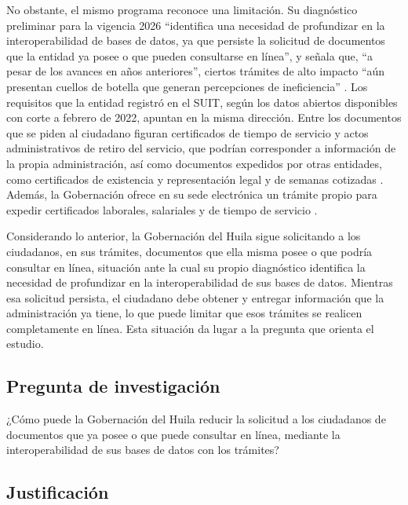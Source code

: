 No obstante, el mismo programa reconoce una limitación. Su diagnóstico preliminar para la vigencia 2026 \enquote{identifica una necesidad de profundizar en la interoperabilidad de bases de datos, ya que persiste la solicitud de documentos que la entidad ya posee o que pueden consultarse en línea}, y señala que, \enquote{a pesar de los avances en años anteriores}, ciertos trámites de alto impacto \enquote{aún presentan cuellos de botella que generan percepciones de ineficiencia} \parencite[p.~134]{gobernaciondelhuila2026ptep}. Los requisitos que la entidad registró en el SUIT, según los datos abiertos disponibles con corte a febrero de 2022, apuntan en la misma dirección. Entre los documentos que se piden al ciudadano figuran certificados de tiempo de servicio y actos administrativos de retiro del servicio, que podrían corresponder a información de la propia administración, así como documentos expedidos por otras entidades, como certificados de existencia y representación legal y de semanas cotizadas \parencite{funcionpublica2022suit} . Además, la Gobernación ofrece en su sede electrónica un trámite propio para expedir certificados laborales, salariales y de tiempo de servicio \parencite{gobernaciondelhuila2026tramites} .

Considerando lo anterior, la Gobernación del Huila sigue solicitando a los ciudadanos, en sus trámites, documentos que ella misma posee o que podría consultar en línea, situación ante la cual su propio diagnóstico identifica la necesidad de profundizar en la interoperabilidad de sus bases de datos. Mientras esa solicitud persista, el ciudadano debe obtener y entregar información que la administración ya tiene, lo que puede limitar que esos trámites se realicen completamente en línea. Esta situación da lugar a la pregunta que orienta el estudio.

\subsection{Pregunta de investigación}

¿Cómo puede la Gobernación del Huila reducir la solicitud a los ciudadanos de documentos que ya posee o que puede consultar en línea, mediante la interoperabilidad de sus bases de datos con los trámites? 

\subsection{Justificación}

